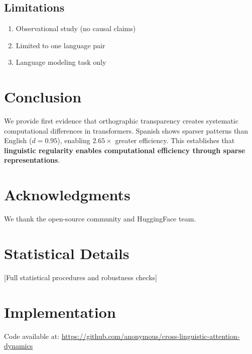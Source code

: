 \documentclass[11pt,a4paper]{article}
\begin{document}
\subsection{Limitations}

\begin{enumerate}
    \item Observational study (no causal claims)
    \item Limited to one language pair
    \item Language modeling task only
\end{enumerate}

\section{Conclusion}

We provide first evidence that orthographic transparency creates systematic computational differences in transformers. Spanish shows sparser patterns than English ($d = 0.95$), enabling $2.65\times$ greater efficiency. This establishes that \textbf{linguistic regularity enables computational efficiency through sparse representations}.

\section*{Acknowledgments}

We thank the open-source community and HuggingFace team.




\appendix

\section{Statistical Details}
[Full statistical procedures and robustness checks]

\section{Implementation}
Code available at: \url{https://github.com/anonymous/cross-linguistic-attention-dynamics}
\end{document}
